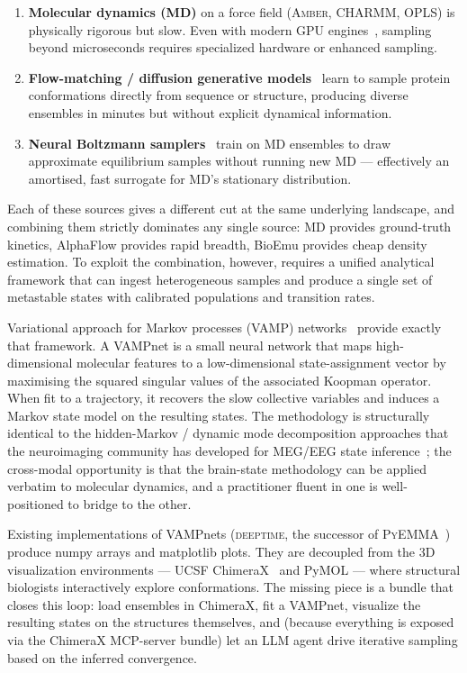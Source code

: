 \documentclass[11pt]{article}
\begin{document}
\begin{enumerate}[leftmargin=*]
  \item \textbf{Molecular dynamics (MD)} on a force field
        (\textsc{Amber}, \textsc{CHARMM}, \textsc{OPLS}) is physically
        rigorous but slow. Even with modern GPU
        engines~\cite{eastman2017openmm}, sampling beyond
        microseconds requires specialized hardware or enhanced sampling.
  \item \textbf{Flow-matching / diffusion generative
        models}~\cite{jing2024alphaflow} learn to sample protein
        conformations directly from sequence or structure, producing
        diverse ensembles in minutes but without explicit dynamical
        information.
  \item \textbf{Neural Boltzmann samplers}~\cite{lewis2026bioemu} train
        on MD ensembles to draw approximate equilibrium samples without
        running new MD --- effectively an amortised, fast surrogate for
        MD's stationary distribution.
\end{enumerate}

Each of these sources gives a different cut at the same underlying
landscape, and combining them strictly dominates any single source:
MD provides ground-truth kinetics, AlphaFlow provides rapid breadth,
BioEmu provides cheap density estimation. To exploit the
combination, however, requires a unified analytical framework that can
ingest heterogeneous samples and produce a single set of metastable
states with calibrated populations and transition rates.

Variational approach for Markov processes (\textsc{VAMP})
networks~\cite{mardt2018vampnets,wu2020variational} provide exactly that
framework. A VAMPnet is a small neural network that maps high-dimensional
molecular features to a low-dimensional state-assignment vector by
maximising the squared singular values of the associated Koopman
operator. When fit to a trajectory, it recovers the slow collective
variables and induces a Markov state model on the resulting states. The
methodology is structurally identical to the hidden-Markov / dynamic
mode decomposition approaches that the neuroimaging community has
developed for MEG/EEG state inference~\cite{vidaurre2018dynamic,
gohil2024osldynamics}; the cross-modal opportunity is that the brain-state
methodology can be applied verbatim to molecular dynamics, and a
practitioner fluent in one is well-positioned to bridge to the other.

Existing implementations of VAMPnets (\textsc{deeptime}, the successor
of \textsc{PyEMMA}~\cite{hoffmann2022deeptime}) produce numpy arrays and
matplotlib plots. They are decoupled from the 3D visualization
environments --- UCSF ChimeraX~\cite{pettersen2021chimerax} and PyMOL ---
where structural biologists interactively explore conformations. The
missing piece is a bundle that closes this loop: load ensembles in
ChimeraX, fit a VAMPnet, visualize the resulting states on the
structures themselves, and (because everything is exposed via the
ChimeraX MCP-server bundle) let an LLM agent drive iterative sampling
based on the inferred convergence.
\end{document}
